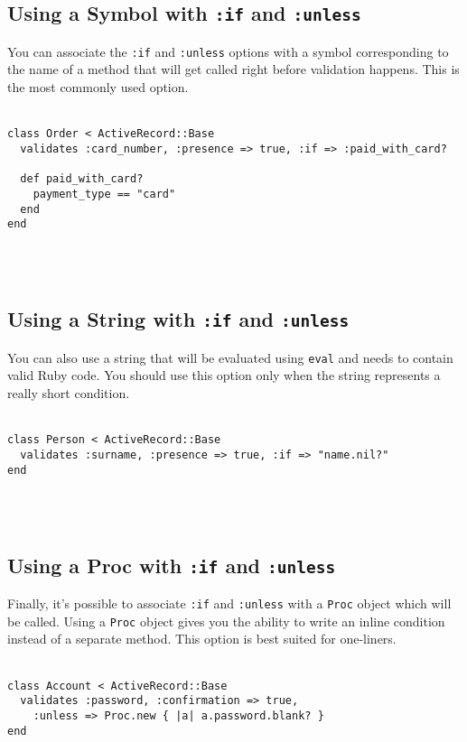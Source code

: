 \documentclass[10pt]{book}
\begin{document}
\subsection{ Using a Symbol with \texttt{:if} and \texttt{:unless}}

You can associate the \texttt{:if} and \texttt{:unless} options with a  symbol corresponding to the name of a method that will get called right  before validation happens. This is the most commonly used option.
\\ \\
\begin{minipage}{\textwidth}{\scriptsize
\begin{verbatim}
class Order < ActiveRecord::Base
  validates :card_number, :presence => true, :if => :paid_with_card?
 
  def paid_with_card?
    payment_type == "card"
  end
end
\end{verbatim}}
\end{minipage}
\\ \\

\subsection{ Using a String with \texttt{:if} and \texttt{:unless}}

You can also use a string that will be evaluated using \texttt{eval} and needs to contain valid Ruby code. You should use this option only when the string represents a really short condition.
\\ \\
\begin{minipage}{\textwidth}{\scriptsize
\begin{verbatim}
class Person < ActiveRecord::Base
  validates :surname, :presence => true, :if => "name.nil?"
end
\end{verbatim}}
\end{minipage}
\\ \\

\subsection{ Using a Proc with \texttt{:if} and \texttt{:unless}}

Finally, it’s possible to associate \texttt{:if} and \texttt{:unless} with a \texttt{Proc} object which will be called. Using a \texttt{Proc}  object gives you the ability to write an inline condition instead of a  separate method. This option is best suited for one-liners.
\\ \\
\begin{minipage}{\textwidth}{\scriptsize
\begin{verbatim}
class Account < ActiveRecord::Base
  validates :password, :confirmation => true,
    :unless => Proc.new { |a| a.password.blank? }
end
\end{verbatim}}
\end{minipage}
\\ \\
\end{document}
